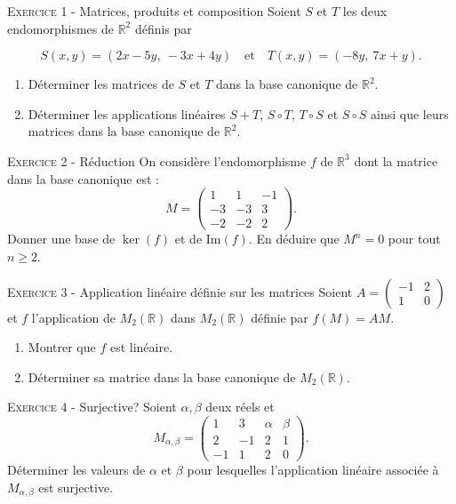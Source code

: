 \documentclass[11pt]{article}
\begin{document}
 

\begin{center}\textsc{{\huge }}\end{center}



\vskip0.3cm\noindent\textsc{Exercice 1} - Matrices, produits et composition
\vskip0.2cm
Soient $S$ et $T$ les deux endomorphismes de $\mathbb R^2$ définis par

$$
S(x,y)=(2x-5y,\ -3x+4y)\quad\text{et}\quad T(x,y)=(-8y,\ 7x+y).
$$
\begin{enumerate}
\item Déterminer les matrices de $S$ et $T$ dans la base canonique de $\mathbb R^2$.
\item Déterminer les applications linéaires $S+T$, $S\circ T$, $T\circ S$ et $S\circ S$ ainsi que leurs matrices dans la base canonique de $\mathbb R^2$.
\end{enumerate}




\vskip0.3cm\noindent\textsc{Exercice 2} - Réduction
\vskip0.2cm
On considère l'endomorphisme $f$ de $\mathbb R^3$ dont la matrice 
dans la base canonique est :
$$M=\left(
\begin{array}{ccc}
1&1&-1\\
-3&-3&3\\
-2&-2&2
\end{array}\right).$$
Donner une base de $\ker(f)$ et de $\textrm{Im}(f)$. En déduire que $M^n=0$ pour tout $n\geq 2$.




\vskip0.3cm\noindent\textsc{Exercice 3} - Application linéaire définie sur les matrices
\vskip0.2cm
Soient $A=\left(\begin{array}{cc}-1&2\\1&0\end{array}\right)$
et $f$ l'application de $M_2(\mathbb R)$ dans $M_2(\mathbb R)$
définie par $f(M)=AM$.
\begin{enumerate}
\item Montrer que $f$ est linéaire.
\item Déterminer sa matrice dans la base canonique de $M_2(\mathbb R)$.
\end{enumerate}




\vskip0.3cm\noindent\textsc{Exercice 4} - Surjective?
\vskip0.2cm
Soient $\alpha,\beta$ deux réels et 
$$M_{\alpha,\beta}=\left(\begin{array}{cccc}
1&3&\alpha&\beta\\
2&-1&2&1\\
-1&1&2&0
\end{array}\right).$$
Déterminer les valeurs de $\alpha$ et $\beta$ pour lesquelles l'application linéaire associée à $M_{\alpha,\beta}$
est surjective.
\end{document}
